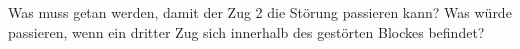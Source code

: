 


Was muss getan werden, damit der Zug 2 die Störung passieren kann? Was würde passieren, wenn ein dritter Zug sich innerhalb des gestörten Blockes befindet?

